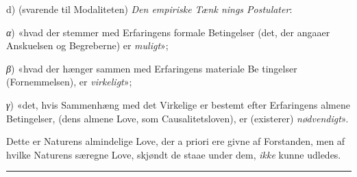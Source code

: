 \documentclass[12pt,a4paper]{book}
\newcommand{\divrule}{\begin{center}\rule{2cm}{0.4pt}\end{center}}
\newcommand{\gk}[1]{\textit{#1}}
\begin{document}
d) (svarende til Modaliteten) \emph{Den empiriske Tænk\-%
nings Postulater}:

\gk{α}) «hvad der stemmer med Erfaringens formale Betingelser
(det, der angaaer Anskuelsen og Begreberne) er \emph{muligt}»;

\gk{β}) «hvad der hænger sammen med Erfaringens materiale Be\-%
tingelser (Fornemmelsen), er \emph{virkeligt}»;

\gk{γ}) «det, hvis Sammenhæng med det Virkelige er bestemt
efter Erfaringens almene Betingelser, (dens almene Love, som
Causalitetsloven), er (existerer) \emph{nødvendigt}».

Dette er Naturens almindelige Love, der a priori ere
givne af Forstanden, men af hvilke Naturens særegne Love,
skjøndt de staae under dem, \emph{ikke} kunne udledes.

\divrule
\end{document}
